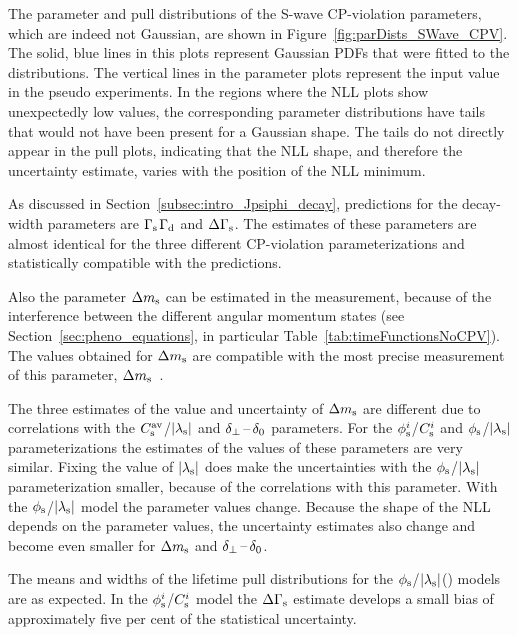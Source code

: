 The parameter and pull distributions of the S-wave CP-violation parameters, which are indeed not Gaussian, are shown in
Figure~\ref{fig:parDists_SWave_CPV}. The solid, blue lines in this plots represent Gaussian PDFs that were fitted to the distributions. The
vertical lines in the parameter plots represent the input value in the pseudo experiments. In the regions where the NLL plots show
unexpectedly low values, the corresponding parameter distributions have tails that would not have been present for a Gaussian shape. The
tails do not directly appear in the pull plots, indicating that the NLL shape, and therefore the uncertainty estimate, varies with the
position of the NLL minimum.

As discussed in Section~\ref{subsec:intro_Jpsiphi_decay}, predictions for the decay-width parameters are
$\Gamma_\text{s}$\textapprox$\Gamma_\text{d}$\unitsp\invps{} and $\Delta\Gamma_\text{s}$\unitsp\invps{}. The estimates of these
parameters are almost identical for the three different CP-violation parameterizations and statistically compatible with the predictions.

Also the parameter $\Delta m_\text{s}$ can be estimated in the \BstoJpsiKK{} measurement, because of the interference between the different angular
momentum states (see Section~\ref{sec:pheno_equations}, in particular Table~\ref{tab:timeFunctionsNoCPV}).  The values obtained for $\Delta m_\text{s}$
are compatible with the most precise measurement of this parameter,
$\Delta m_\text{s}$\unitsp\invps~\cite{LHCb-PAPER-2013-006}.

The three estimates of the value and uncertainty of $\Delta m_\text{s}$ are different due to correlations with the $C_\text{s}^\text{av}$/$|{\lambda_{\text{s}}}|$ and $\delta_{\perp}\,\text{--}\,\delta_{0}$
parameters. For the $\phi_\text{s}^{i}$/$C_\text{s}^{i}$ and $\phi_\text{s}$/$|{\lambda_{\text{s}}}|$ parameterizations the estimates of the values of these parameters are
very similar. Fixing the value of $|{\lambda_{\text{s}}}|$ does make the uncertainties with the $\phi_\text{s}$/$|{\lambda_{\text{s}}}|$ parameterization smaller,
because of the correlations with this parameter. With the $\phi_\text{s}$/$|{\lambda_{\text{s}}}|$ model the parameter values change. Because the shape of the
NLL depends on the parameter values, the uncertainty estimates also change and become even smaller for $\Delta m_\text{s}$ and $\delta_{\perp}\,\text{--}\,\delta_{0}$.

The means and widths of the lifetime pull distributions for the $\phi_\text{s}$/$|{\lambda_{\text{s}}}|$() models are as expected. In the $\phi_\text{s}^{i}$/$C_\text{s}^{i}$
model the $\Delta\Gamma_\text{s}$ estimate develops a small bias of approximately five per cent of the statistical uncertainty.

